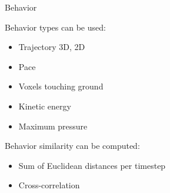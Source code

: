\documentclass{beamer}
\begin{document}
\begin{frame}{Behavior}
\begin{block}{Behavior types can be used:}
\begin{itemize}
\item Trajectory 3D, 2D
\item Pace
\item Voxels touching ground
\item Kinetic energy
\item Maximum pressure
\end{itemize}
\end{block}
\begin{block}{Behavior similarity can be computed:}
\begin{itemize}
\item Sum of Euclidean distances per timestep
\item Cross-correlation
\end{itemize}
\end{block}
\end{frame}
\end{document}
